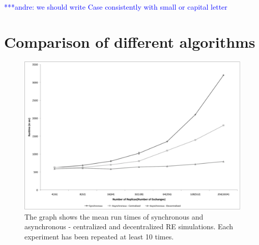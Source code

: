 \documentclass[a4paper,10pt]{article}
\newcommand{\jhanote}[1]{ {\textcolor{red} { ***shantenu: #1 }}}
\newcommand{\alnote}[1]{ {\textcolor{blue} { ***andre: #1 }}}
\newcommand{\alnote}[1]{}
\newcommand{\jhanote}[1]{}
\begin{document}
\alnote{we should write Case consistently with small or capital letter}


\section{Comparison of different algorithms}
%
\begin{figure}
\centering
\includegraphics[scale=0.30]{data/1BJ_comparison.pdf}
\caption{\small The graph shows the mean run times of synchronous and asynchronous - centralized and decentralized RE simulations. Each experiment has been repeated at least 10 times.}
\label{fig:graph}
\vspace{-1em}
\end{figure}
\end{document}
